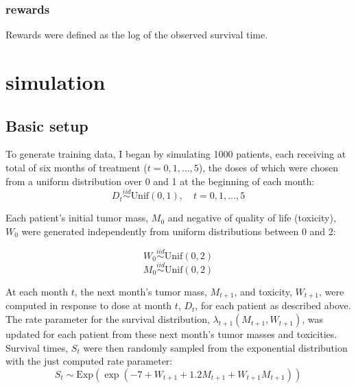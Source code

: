 \documentclass[12pt]{article}
\begin{document}


\subsubsection{rewards} %
\label{sub:}

Rewards were defined as the log of the observed survival time.


\section{simulation} %
\label{sec:simulation}

\subsection{Basic setup} %
\label{sub:basic_setup}

To generate training data, I began by simulating 1000 patients, each receiving at total of six months of treatment ($t = 0, 1, \ldots, 5$), the doses of which were chosen from a uniform distribution over 0 and 1 at the beginning of each month:
\begin{equation}
  D_{t} \overset{iid}{\sim} \text{Unif}(0, 1), \quad t = 0, 1, \ldots, 5
\end{equation}

Each patient's initial tumor mass, $M_{0}$ and negative of quality of life (toxicity), $W_{0}$ were generated independently from uniform distributions between 0 and 2:

\begin{equation}
  W_{0} \overset{iid}{\sim} \text{Unif}(0, 2)
\end{equation}
\begin{equation}
  M_{0} \overset{iid}{\sim} \text{Unif}(0, 2)
\end{equation}

At each month $t$, the next month's tumor mass, $M_{t + 1}$, and toxicity, $W_{t + 1}$, were computed in response to dose at month $t$, $D_{t}$, for each patient as described above. The rate parameter for the survival distribution, $\lambda_{t+1}(M_{t + 1}, W_{t + 1})$, was updated for each patient from these next month's tumor masses and toxicities. Survival times, $S_{t}$ were then randomly sampled from the exponential distribution with the just computed rate parameter:
\begin{equation}
  S_{t} \sim \text{Exp}(\exp(-7 + W_{t+1} + 1.2 M_{t+1} + W_{t+1} M_{t+1}))
\end{equation}
\end{document}
